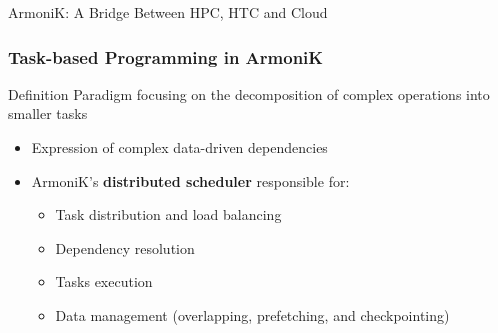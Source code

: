 \documentclass[10pt,aspectratio=1609]{beamer}
\begin{document}
\begin{section}{ArmoniK: A Bridge Between HPC, HTC and Cloud}
  \begin{frame}
    \frametitle{Task-based Programming in ArmoniK}
    \begin{block}{Definition}
      Paradigm focusing on the decomposition of complex operations into smaller tasks
    \end{block}
    \begin{itemize}
      \item Expression of complex data-driven dependencies
      \item ArmoniK's \textbf{distributed scheduler} responsible for:
      \begin{itemize}
        \item Task distribution and load balancing
        \item Dependency resolution
        \item Tasks execution
        \item Data management (overlapping, prefetching, and checkpointing)
      \end{itemize}
    \end{itemize}
  \end{frame}


\end{section}
\end{document}
